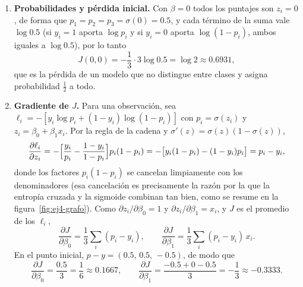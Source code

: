 \begin{enumerate}

\item \textbf{Probabilidades y pérdida inicial.}
Con $\beta=0$ todos los puntajes son $z_i=0$, de forma que
$p_1=p_2=p_3=\sigma(0)=0.5$, y cada término de la suma vale $\log0.5$
(si $y_i=1$ aporta $\log p_i$ y si $y_i=0$ aporta $\log(1-p_i)$, ambos
iguales a $\log0.5$), por lo tanto
\[
    J(0,0) = -\frac13\cdot3\log 0.5 = \log 2 \approx 0.6931 ,
\]
que es la pérdida de un modelo que no distingue entre clases y asigna
probabilidad $\tfrac12$ a todo.

\item \textbf{Gradiente de $J$.}
Para una observación, sea
$\ell_i=-[y_i\log p_i+(1-y_i)\log(1-p_i)]$ con $p_i=\sigma(z_i)$ y
$z_i=\beta_0+\beta_1x_i$. Por la regla de la cadena y
$\sigma'(z)=\sigma(z)(1-\sigma(z))$,
\[
    \frac{\partial\ell_i}{\partial z_i}
    = -\Bigl[\frac{y_i}{p_i} - \frac{1-y_i}{1-p_i}\Bigr]p_i(1-p_i)
    = -\bigl[y_i(1-p_i) - (1-y_i)p_i\bigr]
    = p_i - y_i ,
\]
donde los factores $p_i(1-p_i)$ se cancelan limpiamente con los
denominadores (esa cancelación es precisamente la razón por la que la
entropía cruzada y la sigmoide combinan tan bien, como se resume en la
figura~\ref{fig:ej4-grafo}). Como
$\partial z_i/\partial\beta_0=1$ y $\partial z_i/\partial\beta_1=x_i$,
y $J$ es el promedio de los $\ell_i$,
\[
    \frac{\partial J}{\partial \beta_0} = \frac13\sum_i (p_i-y_i),
    \qquad
    \frac{\partial J}{\partial \beta_1} = \frac13\sum_i (p_i-y_i)\,x_i .
\]
En el punto inicial, $p-y=(0.5,\,0.5,\,-0.5)$, de modo que
\[
    \frac{\partial J}{\partial \beta_0} = \frac{0.5}{3} = \frac16 \approx 0.1667,
    \qquad
    \frac{\partial J}{\partial \beta_1} = \frac{-0.5+0-0.5}{3} = -\frac13 \approx -0.3333 .
\]


\end{enumerate}
